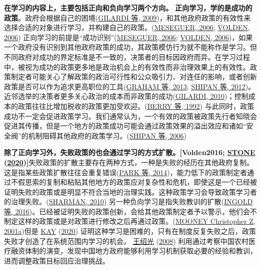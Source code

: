 \documentclass[
  12pt,
]{ctexart}
\begin{document}
\textbf{在学习的内容上，主要包括正向和负向学习两个方向。}
\textbf{正向学习，学的是成功的政策}。政府会根据自己的困境(\protect\hyperlink{ref-GilardiEtAl2009}{GILARDI 等, 2009})，和其他政府政策的有效性来选择合适的对象进行学习，并构建自己的政策。(\protect\hyperlink{ref-Meseguer2006}{MESEGUER, 2006}; \protect\hyperlink{ref-Volden2006}{VOLDEN, 2006})
正向学习的前提是``成功识别''(\protect\hyperlink{ref-Meseguer2006}{MESEGUER, 2006}; \protect\hyperlink{ref-Volden2006}{VOLDEN, 2006})，如果一个政府没有识别到其他政府政策的成功，其政策模仿行为就不能称作是学习。但不同政府对成功的界定标准是不一致的，决策者的目标因政府而异。在学习过程中，被视为成功的政策更多地是政治机会上的有效性而非治理效果上的有效性。政策制定者可能关心了解政策的政治可行性和公众吸引力、对连任的影响，或者创新政策是否可以作为追求更高职位的工具(\protect\hyperlink{ref-GrahamEtAl2013}{GRAHAM 等, 2013}; \protect\hyperlink{ref-ShipanVolden2012}{SHIPAN 等, 2012})。近邻选举的决策者更多关心政治的成本而非政策的成功(\protect\hyperlink{ref-Gilardi2010b}{GILARDI, 2010})；控制成本的政策往往比增加税收的政策更加受欢迎。(\protect\hyperlink{ref-BerryBerry1992}{BERRY 等, 1992})
与此同时，政策成功不一定会促进政策学习。我们通常认为，一个有效的政策被政策先行者知晓会促进其传播，但是一个地方的政策成功可能会通过政策效果的溢出效应和诸如``安全阀''的机制阻碍其他政府的政策学习。(\protect\hyperlink{ref-ShipanVolden2006}{SHIPAN 等, 2006})

\textbf{除了正向学习外，失败政策的也会通过学习的方式扩散。{[}Volden2016; \protect\hyperlink{ref-Stone2020}{STONE} (\protect\hyperlink{ref-Stone2020}{2020}){]}}失败政策的扩散主要存在两种方式，一种是失败的经历在其他政府复制。这是指某些政策扩散往往会重复错误(\protect\hyperlink{ref-ParkBerry2014}{PARK 等, 2014})，能力低下的政策制定者通过不假思索的复制和粘贴其他地方的政策应对复杂性和危机，即使这是一个已经被证明失败的政策或是明显不符合当地的治理实践。这种政策学习会导致政策学习者的治理失败。(\protect\hyperlink{ref-Sharman2010}{SHARMAN, 2010})
另一种负向学习是指失败教训的扩散(\protect\hyperlink{ref-IngoldMonaghan2016}{INGOLD 等, 2016})。已经被证明失败的政策创新，会给其他政策制定者予以警示，他们会不制定这样的政策或是对政策进行修改之后再通过政策。(\protect\hyperlink{ref-Mooney2001}{MOONEY Christopher Z, 2001a})但是 \protect\hyperlink{ref-Kay2020}{KAY} (\protect\hyperlink{ref-Kay2020}{2020}) 证明这种学习是困难的，只有在制度反复失败之后，政策失败才创造了在系统范围内学习的机会。 \protect\hyperlink{ref-WangShaoGuang2008a}{王绍光} (\protect\hyperlink{ref-WangShaoGuang2008a}{2008}) 利用通过考察中国农村医疗融资体制的演变，发现中国地方政府能够利用学习机制获取必要的经验和教训，进而调整政策目标回应治理挑战。
\end{document}
